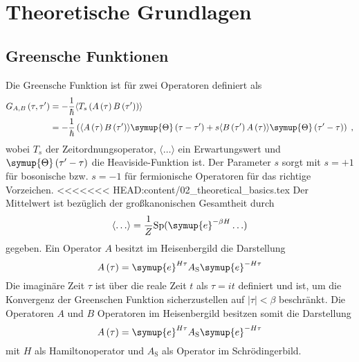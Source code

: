 \chapter{Theoretische Grundlagen}
\label{chap:theoretische_grundlagen}
\section{Greensche Funktionen}
Die Greensche Funktion ist für zwei Operatoren definiert als 
\begin{align}
    G_{A,B} \left (\tau, \tau' \right ) &= - \frac{1}{\hbar} \langle T_s \left ( A \left (\tau \right ) B \left ( \tau' \right ) \right ) \rangle \\
    & = - \frac{1}{\hbar} \left(  \langle A \left (\tau \right ) B \left ( \tau' \right ) \rangle \symup{\Theta} \left ( \tau - \tau' \right) + s 
    \langle B \left ( \tau' \right ) A \left (\tau \right ) \rangle \symup{\Theta} \left ( \tau' - \tau \right)  \right ) \; \text{,} \label{eqn:greensfunction}
\end{align}
wobei $T_s$ der Zeitordnungsoperator, $\langle \ldots \rangle$ ein Erwartungswert und $\symup{\Theta} \left ( \tau' - \tau \right)$ die Heaviside-Funktion ist.\cite{greensfunction}
Der Parameter $s$ sorgt mit $s=+1$ für bosonische bzw. $s=-1$ für fermionische Operatoren für das richtige Vorzeichen.
<<<<<<< HEAD:content/02_theoretical_basics.tex
Der Mittelwert ist bezüglich der großkanonischen Gesamtheit durch 
\begin{equation*}
    \langle \ldots \rangle = \frac{1}{Z} \text{Sp}(\symup{e}^{-\beta H} \ldots)
\end{equation*}
gegeben.\cite{greensfunction}
Ein Operator $A$ besitzt im Heisenbergild die Darstellung 
\begin{equation*}
    A \left ( \tau \right ) = \symup{e}^{H \tau} A_\text{S} \symup{e}^{-H \tau}
\end{equation*}
Die imaginäre Zeit $\tau$ ist über die reale Zeit $t$ als $\tau = it$ definiert und ist, um die Konvergenz der Greenschen Funktion sicherzustellen 
auf $|\tau| < \beta$ beschränkt. \cite{anders-fkt}
Die Operatoren $A$ und $B$ Operatoren im Heisenbergild besitzen somit die Darstellung 
\begin{equation}
    A \left ( \tau \right ) = \symup{e}^{H \tau} A_\text{S} \symup{e}^{-H \tau} \label{eqn:heisenbergpic}
\end{equation}
mit $H$ als Hamiltonoperator und $A_\text{S}$ als Operator im Schrödingerbild. 
